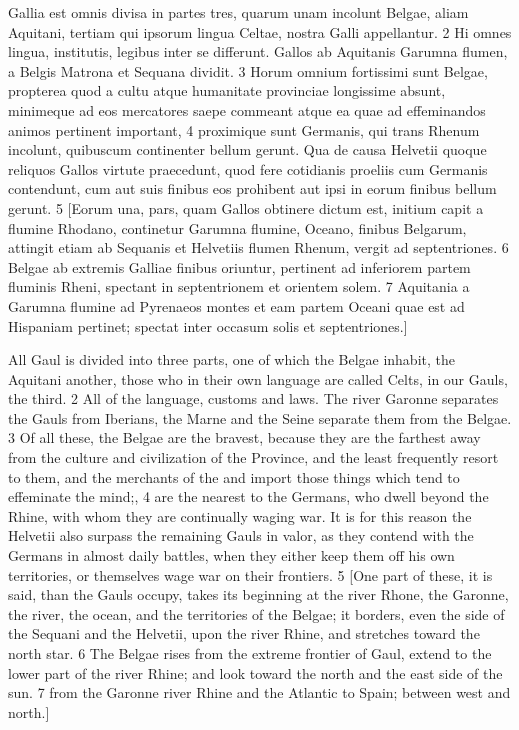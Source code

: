 \documentclass{article}
\begin{document}
\begin{multicols}{2}
Gallia est omnis divisa in partes tres, quarum unam incolunt Belgae, aliam Aquitani, tertiam qui ipsorum lingua Celtae, nostra Galli appellantur. 2 Hi omnes lingua, institutis, legibus inter se differunt. Gallos ab Aquitanis Garumna flumen, a Belgis Matrona et Sequana dividit. 3 Horum omnium fortissimi sunt Belgae, propterea quod a cultu atque humanitate provinciae longissime absunt, minimeque ad eos mercatores saepe commeant atque ea quae ad effeminandos animos pertinent important, 4 proximique sunt Germanis, qui trans Rhenum incolunt, quibuscum continenter bellum gerunt. Qua de causa Helvetii quoque reliquos Gallos virtute praecedunt, quod fere cotidianis proeliis cum Germanis contendunt, cum aut suis finibus eos prohibent aut ipsi in eorum finibus bellum gerunt. 5 [Eorum una, pars, quam Gallos obtinere dictum est, initium capit a flumine Rhodano, continetur Garumna flumine, Oceano, finibus Belgarum, attingit etiam ab Sequanis et Helvetiis flumen Rhenum, vergit ad septentriones. 6 Belgae ab extremis Galliae finibus oriuntur, pertinent ad inferiorem partem fluminis Rheni, spectant in septentrionem et orientem solem. 7 Aquitania a Garumna flumine ad Pyrenaeos montes et eam partem Oceani quae est ad Hispaniam pertinet; spectat inter occasum solis et septentriones.]

\vfill\null
\columnbreak
All Gaul is divided into three parts, one of which the Belgae inhabit, the Aquitani another, those who in their own language are called Celts, in our Gauls, the third. 2 All of the language, customs and laws. The river Garonne separates the Gauls from Iberians, the Marne and the Seine separate them from the Belgae. 3 Of all these, the Belgae are the bravest, because they are the farthest away from the culture and civilization of the Province, and the least frequently resort to them, and the merchants of the and import those things which tend to effeminate the mind;, 4 are the nearest to the Germans, who dwell beyond the Rhine, with whom they are continually waging war. It is for this reason the Helvetii also surpass the remaining Gauls in valor, as they contend with the Germans in almost daily battles, when they either keep them off his own territories, or themselves wage war on their frontiers. 5 [One part of these, it is said, than the Gauls occupy, takes its beginning at the river Rhone, the Garonne, the river, the ocean, and the territories of the Belgae; it borders, even the side of the Sequani and the Helvetii, upon the river Rhine, and stretches toward the north star. 6 The Belgae rises from the extreme frontier of Gaul, extend to the lower part of the river Rhine; and look toward the north and the east side of the sun. 7 from the Garonne river Rhine and the Atlantic to Spain; between west and north.]
\end{multicols}
\end{document}
